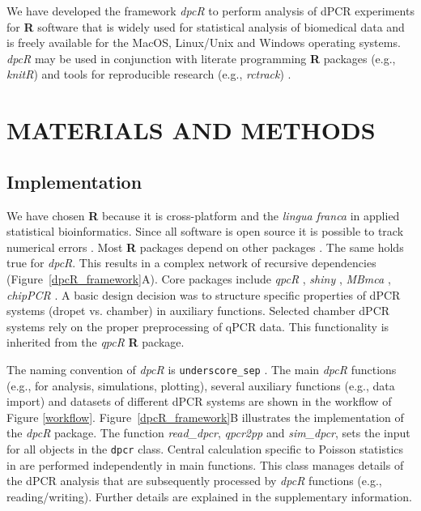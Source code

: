 \documentclass[a4,center,fleqn]{NAR}
\begin{document}
\enlargethispage{-65.1pt}
We have developed the framework \textit{dpcR} to perform analysis of dPCR 
experiments for \textbf{R} software that is widely used for statistical analysis 
of biomedical data and is freely available for the MacOS, Linux/Unix and Windows 
operating systems. \textit{dpcR}  may be used in conjunction with literate 
programming \textbf{R} packages (e.g., \textit{knitR}) and tools for 
reproducible research (e.g.,  \textit{rctrack}) \cite{liu_r_2014, rodiger_r_2015}. 

\section{MATERIALS AND METHODS}

\subsection{Implementation}

We have chosen \textbf{R} because it is cross-platform and the \textit{lingua 
franca} in applied statistical bioinformatics. Since all software is open source 
it is possible to track numerical errors \cite{rodiger_rkward_2012, 
rodiger_r_2015}. Most \textbf{R} packages depend on other packages 
\cite{ooms_2013}. The same holds true for \textit{dpcR}. This results in a 
complex network of recursive dependencies (Figure~\ref{dpcR_framework}A). Core 
packages include \textit{qpcR} \cite{ritz_qpcr_2008}, \textit{shiny} 
\cite{shiny}, \textit{MBmca} \cite{rodiger_surface_2013}, \textit{chipPCR} 
\cite{roediger2015chippcr}. A basic design decision was to structure specific 
properties of dPCR systems (dropet vs. chamber) in auxiliary functions. Selected 
chamber dPCR systems rely on the proper preprocessing of qPCR data. This 
functionality is inherited from the \textit{qpcR} \textbf{R} package.

The naming convention of \textit{dpcR} is \texttt{underscore\_sep} 
\cite{Baaaath_2012}. The main \textit{dpcR} functions (e.g., for analysis, 
simulations, plotting), several auxiliary functions (e.g., data import) and 
datasets of different dPCR systems are shown in the workflow of Figure 
\ref{workflow}. Figure~\ref{dpcR_framework}B illustrates the implementation of 
the \textit{dpcR} package. The function \textit{read\_dpcr}, \textit{qpcr2pp} 
and \textit{sim\_dpcr}, sets the input for all objects in the \texttt{dpcr} 
class. Central calculation specific to Poisson statistics in are performed 
independently in main functions. This class manages details of the dPCR analysis 
that are subsequently processed by \textit{dpcR} functions (e.g., 
reading/writing). Further details are explained in the supplementary 
information.
\end{document}
